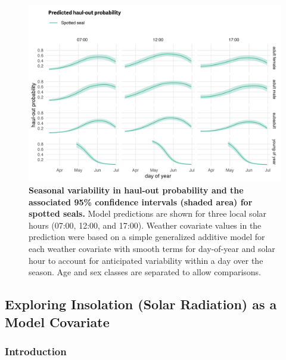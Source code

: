 \documentclass[fleqn,10pt,lineno]{wlpeerj} %
\begin{document}
\begin{figure}
\includegraphics[width=1\linewidth]{../figures/spottedPredSE-1} \caption{\textbf{Seasonal variability in haul-out probability and the associated 95\% confidence intervals (shaded area) for spotted seals.} \linebreak Model predictions are shown for three local solar hours (07:00, 12:00, and 17:00). Weather covariate values in the prediction were based on a simple generalized additive model for each weather covariate with smooth terms for day-of-year and solar hour to account for anticipated variability within a day over the season. Age and sex classes are separated to allow comparisons.}\label{fig:spottedPredSE}
\end{figure}

\clearpage

\hypertarget{exploring-insolation-solar-radiation-as-a-model-covariate}{%
\subsection{Exploring Insolation (Solar Radiation) as a Model Covariate}\label{exploring-insolation-solar-radiation-as-a-model-covariate}}

\hypertarget{introduction-1}{%
\subsubsection{Introduction}\label{introduction-1}}
\end{document}
